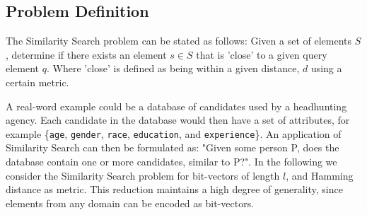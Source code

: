 \documentclass[a4paper,11pt]{article}
\begin{document}
\subsection{Problem Definition}
The Similarity Search problem can be stated as follows: Given a set of elements $S$, determine if there exists an element $s \in S$ that is 'close' to a given query element $q$. Where 'close' is defined as being within a given distance, $d$ using a certain metric.

A real-word example could be a database of candidates used by a headhunting agency. Each candidate in the database would then have a set of attributes, for example \{\texttt{age}, \texttt{gender}, \texttt{race}, \texttt{education}, and \texttt{experience}\}.
An application of Similarity Search can then be formulated as: "Given some person P, does the database contain one or more candidates, similar to P?".
In the following we consider the Similarity Search problem for bit-vectors of length $l$, and Hamming distance as metric. This reduction maintains a high degree of generality, since elements from any domain can be encoded as bit-vectors.
\end{document}
